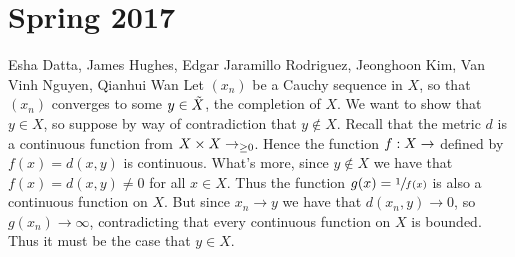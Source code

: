 
\chapter*{Spring 2017}


\begin{solution}{Esha Datta, James Hughes, Edgar Jaramillo Rodriguez, Jeonghoon Kim, Van Vinh Nguyen, Qianhui Wan}
        Let $(x_n)$ be a Cauchy sequence in $X$, so that $(x_n)$ converges to some $y \in \Tilde{X}$, the completion of $X$.
        We want to show that $y \in X$, so suppose by way of contradiction that $y \notin X$.
        Recall that the metric $d$ is a continuous function from $X \times X \to \real_{\geq 0}$.
        Hence the function $f: X \to \real$ defined by $f(x) = d(x,y)$ is continuous.
        What's more, since $y \notin X$ we have that $f(x) = d(x,y) \neq 0$ for all $x \in X$.
        Thus the function $g(x) = \sfrac{1}{f(x)}$ is also a continuous function on $X$.
        But since $x_n \to y$ we have that $d(x_n,y) \to 0$, so $g(x_n) \to \infty$, contradicting that every continuous function on $X$ is bounded.
        Thus it must be the case that $y \in X$.
\end{solution}

